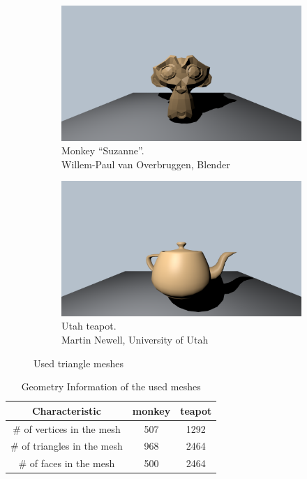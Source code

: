 \documentclass{article}
\begin{document}
\begin{figure}[h]
	\centering
	\begin{subfigure}{0.45\textwidth}
		\includegraphics[width=\textwidth]{monkey}
		\caption{Monkey ``Suzanne''. \\Willem-Paul van Overbruggen, Blender}
		\label{fig:monkey}
	\end{subfigure}%
	\hfill
	\begin{subfigure}{0.45\textwidth}
		\includegraphics[width=\textwidth]{teapot}
		\caption{Utah teapot. \\Martin Newell, University of Utah}
		\label{fig:teapot}
	\end{subfigure}
	
	\caption{Used triangle meshes}
	\label{fig:used_meshes}
\end{figure}

\begin{table}[!ht]
\centering
	\begin{tabular}{*3c} 
		\hline
 		Characteristic & monkey & teapot \\ [0.5ex] 
 		\hline\hline
 		\# of vertices in the mesh & 507 & 1292 \\ 
 		\# of triangles in the mesh & 968 & 2464 \\
 		\# of faces in the mesh & 500 & 2464 \\
 		\hline
	\end{tabular}
\caption{Geometry Information of the used meshes}
\label{table:geometry_stat}
\end{table}
\end{document}
